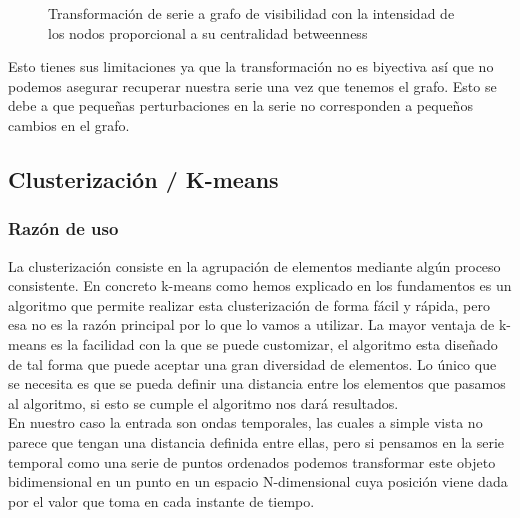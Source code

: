 \documentclass[12pt,a4paper]{article}
\begin{document}
\begin{figure}[H]
\begin{subfigure}{.3\textwidth}
  \label{fig:sub2}
\end{subfigure}
\caption{Transformación de serie a grafo de visibilidad con la intensidad de los nodos proporcional a su centralidad betweenness}
\label{fig:test}
\end{figure}
			Esto tienes sus limitaciones ya que la transformación no es biyectiva así que no podemos asegurar recuperar nuestra serie una vez que tenemos el grafo. Esto se debe a que pequeñas perturbaciones en la serie no corresponden a pequeños cambios en el grafo.\\
			
			
		\subsection{Clusterización / K-means}
			\subsubsection{Razón de uso}
			La clusterización consiste en la agrupación de elementos mediante algún proceso consistente. En concreto k-means como hemos explicado en los fundamentos es un algoritmo que permite realizar esta clusterización de forma fácil y rápida, pero esa no es la razón principal por lo que lo vamos a utilizar. La mayor ventaja de k-means es la facilidad con la que se puede customizar, el algoritmo esta diseñado de tal forma que puede aceptar una gran diversidad de elementos. Lo único que se necesita es que se pueda definir una distancia entre los elementos que pasamos al algoritmo, si esto se cumple el algoritmo nos dará resultados.\\
			En nuestro caso la entrada son ondas temporales, las cuales a simple vista no parece que tengan una distancia definida entre ellas, pero si pensamos en la serie temporal como una serie de puntos ordenados podemos transformar este objeto bidimensional en un punto en un espacio N-dimensional cuya posición viene dada por el valor que toma en cada instante de tiempo.\\
\end{document}
